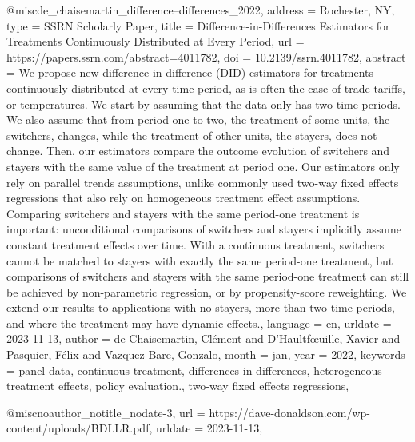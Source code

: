 {@misc{de_chaisemartin_difference--differences_2022,
	address = {Rochester, NY},
	type = {{SSRN} {Scholarly} {Paper}},
	title = {Difference-in-{Differences} {Estimators} for {Treatments} {Continuously} {Distributed} at {Every} {Period}},
	url = {https://papers.ssrn.com/abstract=4011782},
	doi = {10.2139/ssrn.4011782},
	abstract = {We propose new difference-in-difference (DID) estimators for treatments continuously distributed at every time period, as is often the case of trade tariffs, or temperatures. We start by assuming that the data only has two time periods. We also assume that from period one to two, the treatment of some units, the switchers, changes, while the treatment of other units, the stayers, does not change. Then, our estimators compare the outcome evolution of switchers and stayers with the same value of the treatment at period one. Our estimators only rely on parallel trends assumptions, unlike commonly used two-way fixed effects regressions that also rely on homogeneous treatment effect assumptions. Comparing switchers and stayers with the same period-one treatment is important: unconditional comparisons of switchers and stayers implicitly assume constant treatment effects over time. With a continuous treatment, switchers cannot be matched to stayers with exactly the same period-one treatment, but comparisons of switchers and stayers with the same period-one treatment can still be achieved by non-parametric regression, or by propensity-score reweighting. We extend our results to applications with no stayers, more than two time periods,  and where the treatment may have dynamic effects.},
	language = {en},
	urldate = {2023-11-13},
	author = {de Chaisemartin, Clément and D'Haultfœuille, Xavier and Pasquier, Félix and Vazquez‐Bare, Gonzalo},
	month = jan,
	year = {2022},
	keywords = {panel data, continuous treatment, differences-in-differences, heterogeneous treatment effects, policy evaluation., two-way fixed effects regressions},
}

@misc{noauthor_notitle_nodate-3,
	url = {https://dave-donaldson.com/wp-content/uploads/BDLLR.pdf},
	urldate = {2023-11-13},
}

}
